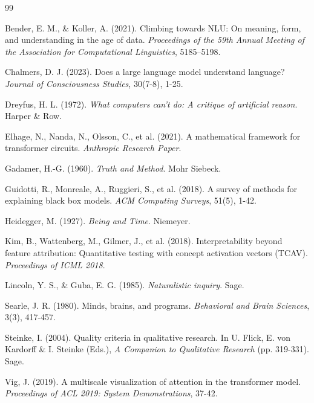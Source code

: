 \documentclass[12pt,a4paper]{article}
\begin{document}
\begin{thebibliography}{99}

Bender, E. M., \& Koller, A. (2021). Climbing towards NLU: On meaning, form, and understanding in the age of data. \textit{Proceedings of the 59th Annual Meeting of the Association for Computational Linguistics}, 5185–5198.

Chalmers, D. J. (2023). Does a large language model understand language? \textit{Journal of Consciousness Studies}, 30(7-8), 1-25.

Dreyfus, H. L. (1972). \textit{What computers can't do: A critique of artificial reason}. Harper \& Row.

Elhage, N., Nanda, N., Olsson, C., et al. (2021). A mathematical framework for transformer circuits. \textit{Anthropic Research Paper}.

Gadamer, H.-G. (1960). \textit{Truth and Method}. Mohr Siebeck.

Guidotti, R., Monreale, A., Ruggieri, S., et al. (2018). A survey of methods for explaining black box models. \textit{ACM Computing Surveys}, 51(5), 1-42.

Heidegger, M. (1927). \textit{Being and Time}. Niemeyer.

Kim, B., Wattenberg, M., Gilmer, J., et al. (2018). Interpretability beyond feature attribution: Quantitative testing with concept activation vectors (TCAV). \textit{Proceedings of ICML 2018}.

Lincoln, Y. S., \& Guba, E. G. (1985). \textit{Naturalistic inquiry}. Sage.

Searle, J. R. (1980). Minds, brains, and programs. \textit{Behavioral and Brain Sciences}, 3(3), 417-457.

Steinke, I. (2004). Quality criteria in qualitative research. In U. Flick, E. von Kardorff \& I. Steinke (Eds.), \textit{A Companion to Qualitative Research} (pp. 319-331). Sage.

Vig, J. (2019). A multiscale visualization of attention in the transformer model. \textit{Proceedings of ACL 2019: System Demonstrations}, 37-42.

\end{thebibliography}
\end{document}
